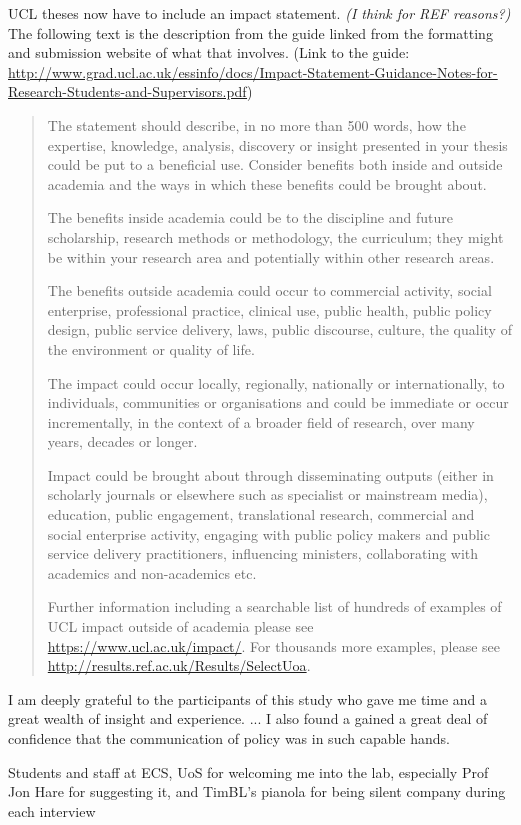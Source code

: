 \begin{impactstatement}

	UCL theses now have to include an impact statement. \textit{(I think for REF reasons?)} The following text is the description from the guide linked from the formatting and submission website of what that involves. (Link to the guide: {\scriptsize \url{http://www.grad.ucl.ac.uk/essinfo/docs/Impact-Statement-Guidance-Notes-for-Research-Students-and-Supervisors.pdf}})

\begin{quote}
The statement should describe, in no more than 500 words, how the expertise, knowledge, analysis,
discovery or insight presented in your thesis could be put to a beneficial use. Consider benefits both
inside and outside academia and the ways in which these benefits could be brought about.

The benefits inside academia could be to the discipline and future scholarship, research methods or
methodology, the curriculum; they might be within your research area and potentially within other
research areas.

The benefits outside academia could occur to commercial activity, social enterprise, professional
practice, clinical use, public health, public policy design, public service delivery, laws, public
discourse, culture, the quality of the environment or quality of life.

The impact could occur locally, regionally, nationally or internationally, to individuals, communities or
organisations and could be immediate or occur incrementally, in the context of a broader field of
research, over many years, decades or longer.

Impact could be brought about through disseminating outputs (either in scholarly journals or
elsewhere such as specialist or mainstream media), education, public engagement, translational
research, commercial and social enterprise activity, engaging with public policy makers and public
service delivery practitioners, influencing ministers, collaborating with academics and non-academics
etc.

Further information including a searchable list of hundreds of examples of UCL impact outside of
academia please see \url{https://www.ucl.ac.uk/impact/}. For thousands more examples, please see
\url{http://results.ref.ac.uk/Results/SelectUoa}.
\end{quote}
\end{impactstatement}

\begin{acknowledgements}
I am deeply grateful to the participants of this study who gave me time and a great wealth of insight and experience. ... I also found a gained a great deal of confidence that the communication of policy was in such capable hands. 

Students and staff at ECS, UoS for welcoming me into the lab, especially Prof Jon Hare for suggesting it, and TimBL's pianola for being silent company during each interview
\end{acknowledgements}
\fi

\setcounter{tocdepth}{2} 

\tableofcontents
\listoffigures
\listoftables


